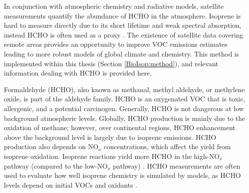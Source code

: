   In conjunction with atmospheric chemistry and radiative models, satellite measurements quantify the abundance of HCHO in the atmosphere.
  Isoprene is hard to measure directly due to its short lifetime and weak spectral absorption, instead HCHO is often used as a proxy \parencite{Millet2006, Fu2007, Dufour2009, Marais2012, bauwens2013satellite, Kefauver2014, Bauwens2016, Surl2018}.
  The existence of satellite data covering remote areas provides an opportunity to improve VOC emissions estimates leading to more robust models of global climate and chemistry. 
  This method is implemented within this thesis (Section \ref{BioIsop:method}), and relevant information dealing with HCHO is provided here.
  
  
  Formaldehyde (HCHO), also known as methanal, methyl aldehyde, or methylene oxide, is part of the aldehyde family.
  HCHO is an oxygenated VOC that is toxic, allergenic, and a potential carcinogen.
  Generally, HCHO is not dangerous at low background atmospheric levels.
  Globally, HCHO production is mainly due to the oxidation of methane; however, over continental regions, HCHO enhancement above the background level is largely due to isoprene emissions.
  HCHO production also depends on NO$_x$ concentrations, which affect the yield from isoprene oxidation.
  Isoprene reactions yield more HCHO in the high-NO$_x$ pathway (compared to the low-NO$_x$ pathway) \parencite{Marais2012}.
  HCHO measurements are often used to evaluate how well isoprene chemistry is simulated by models, as HCHO levels depend on initial VOCs and oxidants \parencite{Marvin2017}.
  
  
